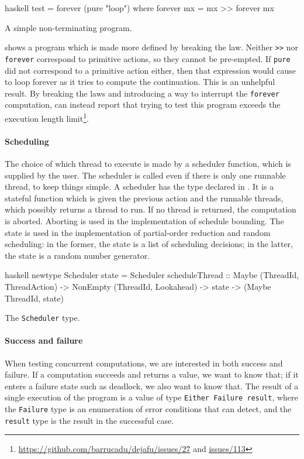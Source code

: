 \begin{listing}
\centering
\begin{cminted}{haskell}
test = forever (pure "loop") where
  forever mx = mx >> forever mx
\end{cminted}
\caption{A simple non-terminating program.}\label{lst:forever}
\end{listing}

 shows a program which is made more defined by
breaking the law.  Neither \verb|>>| nor \verb|forever| correspond to
primitive actions, so they cannot be pre-empted.  If \verb|pure| did
not correspond to a primitive action either, then that expression
would cause \dejafu{} to loop forever as it tries to compute the
continuation.  This is an unhelpful result.  By breaking the laws and
introducing a way to interrupt the \verb|forever| computation,
\dejafu{} can instead report that trying to test this program exceeds
the execution length
limit\footnote{\url{https://github.com/barrucadu/dejafu/issues/27} and
  \url{issues/113}}.

\paragraph{Scheduling}
The choice of which thread to execute is made by a scheduler function,
which is supplied by the user.  The scheduler is called even if there
is only one runnable thread, to keep things simple.  A scheduler has
the type declared in .  It is a stateful function
which is given the previous action and the runnable threads, which
possibly returns a thread to run.  If no thread is returned, the
computation is aborted.  Aborting is used in the implementation of
schedule bounding.  The state is used in the implementation of
partial-order reduction and random scheduling: in the former, the
state is a list of scheduling decisions; in the latter, the state is a
random number generator.

\begin{listing}
\centering
\begin{cminted}{haskell}
newtype Scheduler state = Scheduler
  { scheduleThread
    :: Maybe (ThreadId, ThreadAction)
    -> NonEmpty (ThreadId, Lookahead)
    -> state
    -> (Maybe ThreadId, state)
  }
\end{cminted}
\caption{The \dejafu{} \texttt{Scheduler} type.}\label{lst:scheduler}
\end{listing}

\paragraph{Success and failure}
When testing concurrent computations, we are interested in both
success and failure.  If a computation succeeds and returns a value,
we want to know that; if it enters a failure state such as deadlock,
we also want to know that.  The result of a single execution of the
program is a value of type \verb|Either Failure result|, where the
\verb|Failure| type is an enumeration of error conditions that
\dejafu{} can detect, and the \verb|result| type is the result in the
successful case.

